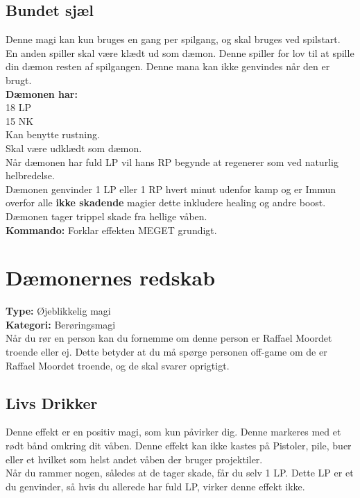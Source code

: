\subsection*{Bundet sjæl}
Denne magi kan kun bruges en gang per spilgang, og skal bruges ved spilstart. En anden spiller skal være klædt ud som dæmon. Denne spiller for lov til at spille din dæmon resten af spilgangen. Denne mana kan ikke genvindes når den er brugt.\\
\textbf{Dæmonen har:}\\
18 LP\\ 
15 NK\\
Kan benytte rustning.\\
Skal være udklædt som dæmon.\\
Når dæmonen har fuld LP vil hans RP begynde at regenerer som ved naturlig helbredelse.\\
Dæmonen genvinder 1 LP eller 1 RP hvert minut udenfor kamp og er Immun overfor alle \textbf{ikke skadende} magier dette inkludere healing og andre boost.\\
Dæmonen tager trippel skade fra hellige våben. \\
\textbf{Kommando:} Forklar effekten MEGET grundigt.

\section*{Dæmonernes redskab}
\textbf{Type:} Øjeblikkelig magi\\
\textbf{Kategori:} Berøringsmagi\\
Når du rør en person kan du fornemme om denne person er Raffael Moordet troende eller ej. Dette betyder at du må spørge personen off-game om de er Raffael Moordet troende, og de skal svarer oprigtigt.

\subsection*{Livs Drikker} Denne effekt er en positiv magi, som kun påvirker dig. Denne markeres med et rødt bånd omkring dit våben. Denne effekt kan ikke kastes på Pistoler, pile, buer eller et hvilket som helst andet våben der bruger projektiler.\\ 
Når du rammer nogen, således at de tager skade, får du selv 1 LP. Dette LP er et du genvinder, så hvis du allerede har fuld LP, virker denne effekt ikke.\\

